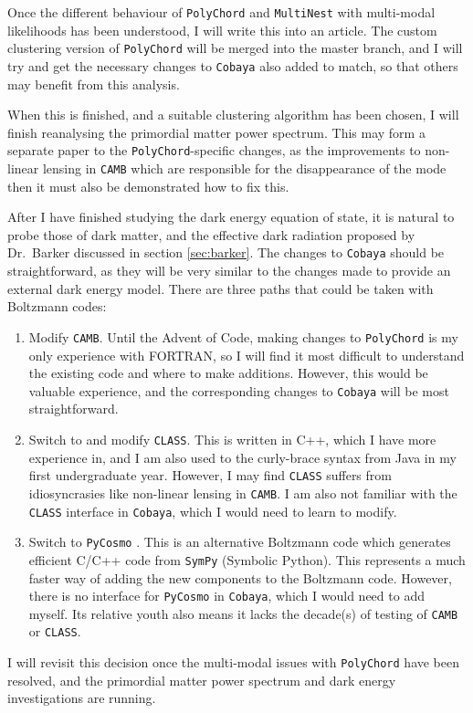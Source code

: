 \documentclass{article}
\begin{document}
Once the different behaviour of \texttt{PolyChord} and \texttt{MultiNest} with multi-modal likelihoods has been understood, I will write this into an article. The custom clustering version of \texttt{PolyChord} will be merged into the master branch, and I will try and get the necessary changes to \texttt{Cobaya} also added to match, so that others may benefit from this analysis.

When this is finished, and a suitable clustering algorithm has been chosen, I will finish reanalysing the primordial matter power spectrum. This may form a separate paper to the \texttt{PolyChord}-specific changes, as the improvements to non-linear lensing in \texttt{CAMB} which are responsible for the disappearance of the mode then it must also be demonstrated how to fix this.

After I have finished studying the dark energy equation of state, it is natural to probe those of dark matter, and the effective dark radiation proposed by Dr.~Barker discussed in section \ref{sec:barker}. The changes to \texttt{Cobaya} should be straightforward, as they will be very similar to the changes made to provide an external dark energy model. There are three paths that could be taken with Boltzmann codes:
\begin{enumerate}
  \item Modify \texttt{CAMB}. Until the Advent of Code, making changes to \texttt{PolyChord} is my only experience with FORTRAN, so I will find it most difficult to understand the existing code and where to make additions. However, this would be valuable experience, and the corresponding changes to \texttt{Cobaya} will be most straightforward.
  \item Switch to and modify \texttt{CLASS}. This is written in C++, which I have more experience in, and I am also used to the curly-brace syntax from Java in my first undergraduate year. However, I may find \texttt{CLASS} suffers from idiosyncrasies like non-linear lensing in \texttt{CAMB}. I am also not familiar with the \texttt{CLASS} interface in \texttt{Cobaya}, which I would need to learn to modify.
  \item Switch to \texttt{PyCosmo} \cite{pycosmo}. This is an alternative Boltzmann code which generates efficient C/C++ code from \texttt{SymPy} (Symbolic Python). This represents a much faster way of adding the new components to the Boltzmann code. However, there is no interface for \texttt{PyCosmo} in \texttt{Cobaya}, which I would need to add myself. Its relative youth also means it lacks the decade(s) of testing of \texttt{CAMB} or \texttt{CLASS}.
\end{enumerate}
%
I will revisit this decision once the multi-modal issues with \texttt{PolyChord} have been resolved, and the primordial matter power spectrum and dark energy investigations are running.
\end{document}
